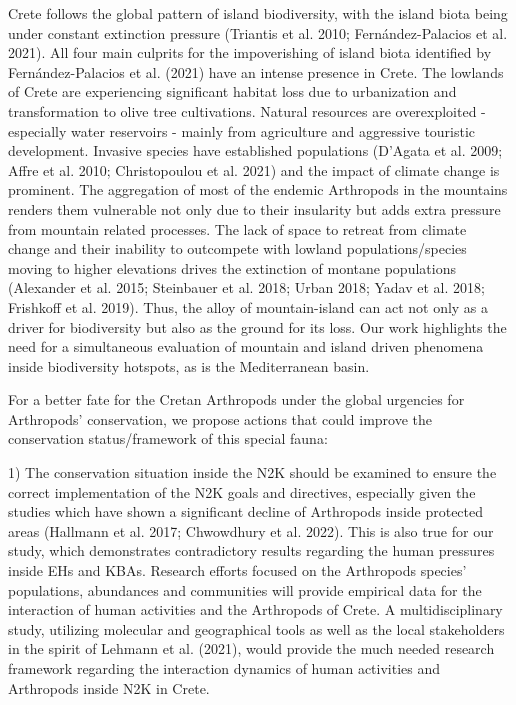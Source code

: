 Crete follows the global pattern of island biodiversity, with the island biota
being under constant extinction pressure (Triantis et al. 2010; Fernández-Palacios et al. 2021).
All four main culprits for the impoverishing of island biota identified by
Fernández-Palacios et al. (2021) have an intense presence in Crete. The
lowlands of Crete are experiencing significant habitat loss due to urbanization
and transformation to olive tree cultivations. Natural resources are
overexploited - especially water reservoirs - mainly from agriculture and
aggressive touristic development. Invasive species have established populations
(D'Agata et al. 2009; Affre et al. 2010; Christopoulou et al. 2021) and the
impact of climate change is prominent. The aggregation of most of the endemic
Arthropods in the mountains renders them vulnerable not only due to their
insularity but adds extra pressure from mountain related processes. The lack of
space to retreat from climate change and their inability to outcompete with
lowland populations/species moving to higher elevations drives the extinction
of montane populations (Alexander et al. 2015; Steinbauer et al. 2018; Urban 2018; Yadav et al. 2018; Frishkoff et al. 2019).
Thus, the alloy of mountain-island can act not only as a driver for
biodiversity but also as the ground for its loss. Our work highlights the need
for a simultaneous evaluation of mountain and island driven phenomena inside
biodiversity hotspots, as is the Mediterranean basin.

For a better fate for the Cretan Arthropods under the global urgencies for
Arthropods’ conservation, we propose actions that could improve the
conservation status/framework of this special fauna:

1) The conservation situation inside the N2K should be examined to ensure the
correct implementation of the N2K goals and directives, especially given the
studies which have shown a significant decline of Arthropods inside protected
areas (Hallmann et al. 2017; Chwowdhury et al. 2022). This is also true for our
study, which demonstrates contradictory results regarding the human pressures
inside EHs and KBAs. Research efforts focused on the Arthropods species’
populations, abundances and communities will provide empirical data for the
interaction of human activities and the Arthropods of Crete. A multidisciplinary
study, utilizing molecular and geographical tools as well as the local
stakeholders in the spirit of Lehmann et al. (2021), would provide the much
needed research framework regarding the interaction dynamics of human activities
and Arthropods inside N2K in Crete.

